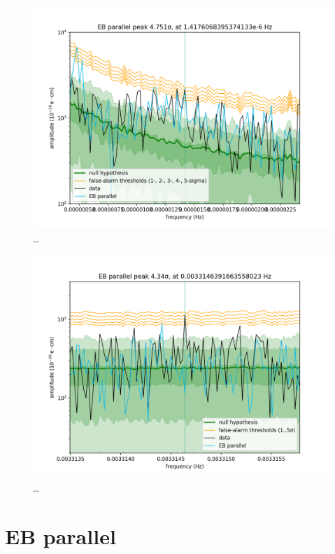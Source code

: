 \begin{figure}
  \centering
  \includegraphics[width=\linewidth]{gfx/axions/AP_detection_peak_62.png}
  \caption{\ldots}
  \label{fig:AP_detection_peak_62}
\end{figure}
\begin{figure}
  \centering
  \includegraphics[width=\linewidth]{gfx/axions/AP_detection_peak_144968.png}
  \caption{\ldots}
  \label{fig:AP_detection_peak_144968}
\end{figure}


\section{EB parallel}

